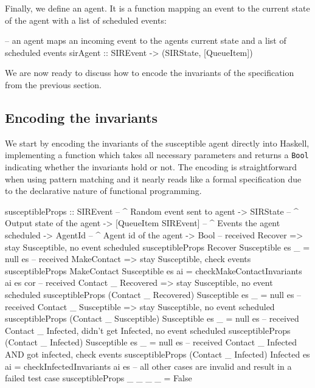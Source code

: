 Finally, we define an agent. It is a function mapping an event to the current state of the agent with a list of scheduled events:

\begin{HaskellCode}
-- an agent maps an incoming event to the agents current state and a list of scheduled events
sirAgent :: SIREvent -> (SIRState, [QueueItem])
\end{HaskellCode}

We are now ready to discuss how to encode the invariants of the specification from the previous section.

\subsection{Encoding the invariants}
We start by encoding the invariants of the susceptible agent directly into Haskell, implementing a function which takes all necessary parameters and returns a \texttt{Bool} indicating whether the invariants hold or not. The encoding is straightforward when using pattern matching and it nearly reads like a formal specification due to the declarative nature of functional programming.

\begin{HaskellCode}
susceptibleProps :: SIREvent              -- ^ Random event sent to agent
                 -> SIRState              -- ^ Output state of the agent
                 -> [QueueItem SIREvent]  -- ^ Events the agent scheduled
                 -> AgentId               -- ^ Agent id of the agent
                 -> Bool
-- received Recover => stay Susceptible, no event scheduled
susceptibleProps Recover Susceptible es _ = null es
-- received MakeContact => stay Susceptible, check events
susceptibleProps MakeContact Susceptible es ai
  = checkMakeContactInvariants ai es cor 
-- received Contact _ Recovered => stay Susceptible, no event scheduled
susceptibleProps (Contact _ Recovered) Susceptible es _ = null es
-- received Contact _ Susceptible => stay Susceptible, no event scheduled
susceptibleProps (Contact _ Susceptible) Susceptible es _  = null es
-- received Contact _ Infected, didn't get Infected, no event scheduled
susceptibleProps (Contact _ Infected) Susceptible es _ = null es
-- received Contact _ Infected AND got infected, check events
susceptibleProps (Contact _ Infected) Infected es ai
  = checkInfectedInvariants ai es
-- all other cases are invalid and result in a failed test case
susceptibleProps _ _ _ _ = False
\end{HaskellCode}

